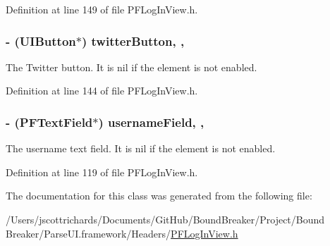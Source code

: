 Definition at line 149 of file P\+F\+Log\+In\+View.\+h.

\hypertarget{interface_p_f_log_in_view_a831da16d37f7dc63b2d37d198eaafba0}{}
\subsubsection[{twitter\+Button}]{\setlength{\rightskip}{0pt plus 5cm}-\/ (U\+I\+Button$\ast$) twitter\+Button\hspace{0.3cm}{\ttfamily [read]}, {\ttfamily [nonatomic]}, {\ttfamily [strong]}}\label{interface_p_f_log_in_view_a831da16d37f7dc63b2d37d198eaafba0}
The Twitter button. It is {\ttfamily nil} if the element is not enabled. 

Definition at line 144 of file P\+F\+Log\+In\+View.\+h.

\hypertarget{interface_p_f_log_in_view_af6c5b3c59071b1c79442f4781f703ad2}{}
\subsubsection[{username\+Field}]{\setlength{\rightskip}{0pt plus 5cm}-\/ ({\bf P\+F\+Text\+Field}$\ast$) username\+Field\hspace{0.3cm}{\ttfamily [read]}, {\ttfamily [nonatomic]}, {\ttfamily [strong]}}\label{interface_p_f_log_in_view_af6c5b3c59071b1c79442f4781f703ad2}
The username text field. It is {\ttfamily nil} if the element is not enabled. 

Definition at line 119 of file P\+F\+Log\+In\+View.\+h.



The documentation for this class was generated from the following file\+:\begin{DoxyCompactItemize}
\item 
/\+Users/jscottrichards/\+Documents/\+Git\+Hub/\+Bound\+Breaker/\+Project/\+Bound Breaker/\+Parse\+U\+I.\+framework/\+Headers/\hyperlink{_p_f_log_in_view_8h}{P\+F\+Log\+In\+View.\+h}\end{DoxyCompactItemize}

